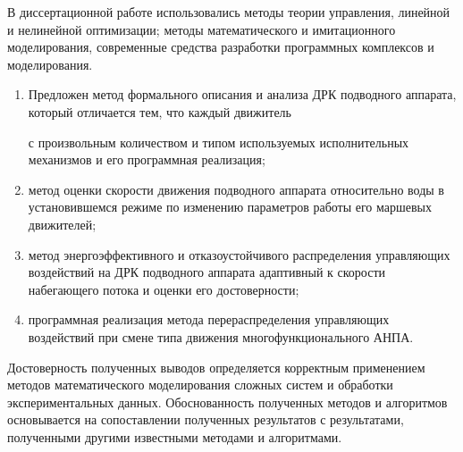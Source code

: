 {\methods} В диссертационной работе использовались методы теории управления, линейной и нелинейной оптимизации; методы математического и имитационного моделирования, современные средства разработки программных комплексов и моделирования.

{}
\begin{enumerate}[beginpenalty=10000] %
  \item Предложен метод формального описания и анализа ДРК подводного аппарата, который отличается тем, что каждый движитель 

  с произвольным количеством и типом используемых исполнительных механизмов и его программная реализация;
  \item метод оценки скорости движения подводного аппарата относительно воды в установившемся режиме по изменению параметров работы его маршевых движителей;
  \item метод энергоэффективного и отказоустойчивого распределения управляющих воздействий на ДРК подводного аппарата адаптивный к скорости набегающего потока и оценки его достоверности;
  \item программная реализация метода перераспределения управляющих воздействий при смене типа движения многофункционального АНПА.
\end{enumerate}

{\reliability} Достоверность полученных выводов определяется корректным применением методов математического моделирования сложных систем и обработки экспериментальных данных. Обоснованность полученных методов и алгоритмов основывается на сопоставлении полученных результатов с результатами, полученными другими известными методами и алгоритмами.

